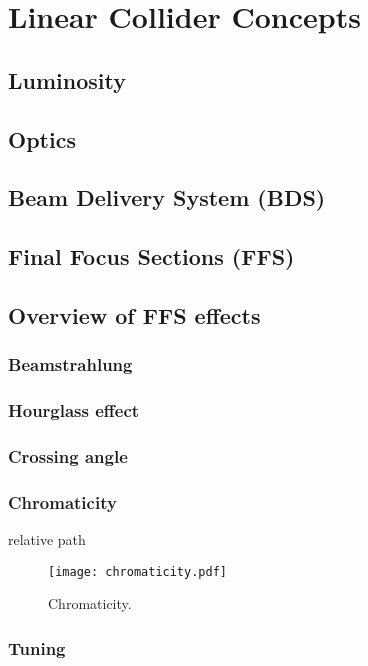 \chapter{Linear Collider Concepts}
\section{Luminosity}
\section{Optics}
\section{Beam Delivery System (BDS)}
\section{Final Focus Sections (FFS)}
\section{Overview of FFS effects}
\subsection{Beamstrahlung}
\subsection{Hourglass effect}
\subsection{Crossing angle}
\subsection{Chromaticity}
relative path 
\begin{figure}[!hbt]
\centering
\texttt{[image: chromaticity.pdf]}\caption{Chromaticity.}\label{f:chrom}
\end{figure}
\subsection{Tuning}
